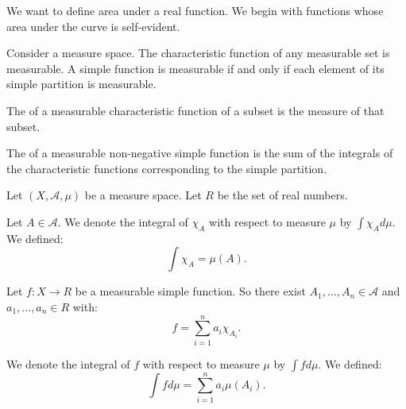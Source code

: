 
\sbasic



\sstart




We want to define area
under a real function.
We begin with functions
whose area under the curve
is self-evident.


Consider a measure space.
The characteristic function
of any measurable set
is measurable.
A simple function is measurable
if and only if
each element of
its simple partition
is measurable.

The
of a measurable characteristic function
of a subset is the
measure of that subset.

The
of a measurable non-negative simple function
is the sum of the integrals
of the characteristic functions
corresponding to the
simple partition.



Let $(X, \mathcal{A}, \mu)$
be a measure space.
Let
$R$ be the
set of real numbers.

Let $A \in \mathcal{A}$.
We denote the integral
of $\chi_{A}$ with
respect to measure $\mu$ by
$\int \chi_{A} d \mu$.
We defined:
\[
  \int \chi_{A} = \mu(A).
\]

Let $f: X \to R$ be
a measurable simple function.
So there exist
$A_1, \dots, A_n \in \mathcal{A}$
and $a_1, \dots, a_n \in R$ with:
\[
  f = \sum_{i = 1}^{n} a_i \chi_{A_i}.
\]

We denote the integral of
$f$
with respect to measure $\mu$
by $\int f d\mu$.
We defined:
\[
  \int f d\mu = \sum_{i = 1}^{n} a_i \mu(A_i).
\]


\strats
